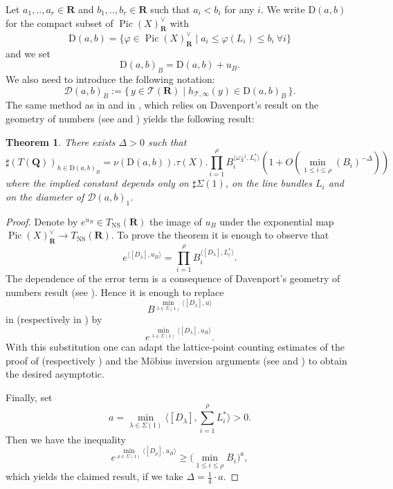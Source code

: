 \documentclass{proc-l}
\newcommand{\R}{\mathbf{R}}
\newcommand{\Q}{\mathbf{Q}}
\DeclareMathOperator{\Pic}{Pic}
\newcommand{\stackT}{\mathcal{T}}
\newcommand{\w}{\omega}
\newtheorem{theorem}{Theorem}[section]
\theoremstyle{definition}
\theoremstyle{remark}
\numberwithin{equation}{section}
\begin{document}
Let $a_1,..,a_r \in \R$ and $b_1,..,b_r \in \R$ such that $a_i < b_i$ for any $i$. We write $\mathrm{D}(a,b)$ for the compact subset of $\Pic(X)^{\vee}_{\R}$ with $$\mathrm{D}(a,b) = \{ \varphi \in \Pic(X)^{\vee}_{\R} \mid a_i \leqslant \varphi(L_i) \leqslant b_i \ \forall i\}  $$ and we set $$\mathrm{D}(a,b)_B = \mathrm{D}(a,b) + u_B  .$$We also need to introduce the following notation:
$$
\mathcal{D}(a,b)_B := \{\, y \in \stackT(\R) \mid h_{\stackT,\infty}(y) \in \mathrm{D}(a,b)_B \,\}.
$$The same method as in \cite[Corollary 4.8 and Theorem 4.16]{bongiorno2024multiheightanalysisrationalpoints} and in \cite[Corollary 7.8 and Theorem 7.16]{bongiorno_toric_stacks}, which relies on Davenport’s result on the geometry of numbers (see \cite{davenport_geometry_numbers} and \cite[Proposition 24]{bhargava_counting_cubic_field}) yields the following result:

\begin{theorem}\label{theorem_multi_height_simplicial_cone}
    There exists $\Delta > 0$ such that $$\sharp\left( T(\Q) \right)_{h \in \mathrm{D}(a,b)_B} = \nu(\mathrm{D}(a,b) ) . \tau(X) .  \prod\limits_{i = 1}^{\rho} B_i^{\langle \w_X^{-1},L_i^* \rangle} \left( 1 + O\left(\min\limits_{1 \leqslant i \leqslant \rho}(B_i)^{- \Delta} \right)\right) $$where the implied constant depends only on $\sharp \Sigma(1)$, on the line bundles $L_i$ and on the diameter of $\mathcal{D}(a,b)_1$.
\end{theorem}

\begin{proof}
  Denote by \(e^{u_B}\in T_{\mathrm{NS}}(\R)\) the image of \(u_B\) under the exponential map
\(\operatorname{Pic}(X)^{\vee}_{\R}\to T_{\mathrm{NS}}(\R)\).
To prove the theorem it is enough to observe that
\[
e^{\langle [D_{\lambda}],u_B \rangle}
= \prod_{i = 1}^{\rho} B_i^{\langle [D_{\lambda}],L_i^* \rangle}.
\]
The dependence of the error term is a consequence of Davenport's geometry of numbers result
(see \cite[Proposition 4.1]{bongiorno2024multiheightanalysisrationalpoints}).
Hence it is enough to replace
\[
B^{\min\limits_{\lambda \in \Sigma(1)} \langle [D_{\lambda}] , u \rangle}
\]
in \cite{bongiorno2024multiheightanalysisrationalpoints} (respectively in \cite{bongiorno_toric_stacks})
by
\[
e^{\min\limits_{\lambda \in \Sigma(1)} \langle [D_{\lambda}] , u_B \rangle}.
\]
With this substitution one can adapt the lattice-point counting estimates of the proof of 
\cite[Theorem 4.6]{bongiorno2024multiheightanalysisrationalpoints}
(respectively \cite[Theorem 7.6]{bongiorno_toric_stacks}) and the Möbius inversion arguments
(see \cite[Theorem 4.14]{bongiorno2024multiheightanalysisrationalpoints} and \cite[Theorem 7.13]{bongiorno_toric_stacks})
to obtain the desired asymptotic.

Finally, set
\[
a = \min_{\lambda \in \Sigma(1)} \langle [D_{\lambda}] , \sum_{i = 1}^{\rho} L_i^* \rangle  > 0.
\]
Then we have the inequality
\[
e^{\min\limits_{\rho \in \Sigma(1)} \langle [D_{\rho}] , u_B \rangle}
\geqslant
\bigg(\min_{1 \leqslant i \leqslant \rho} B_i\bigg)^{a},
\]
which yields the claimed result, if we take $\Delta = \frac{1}{4} \cdot a$.

\end{proof}
\end{document}
